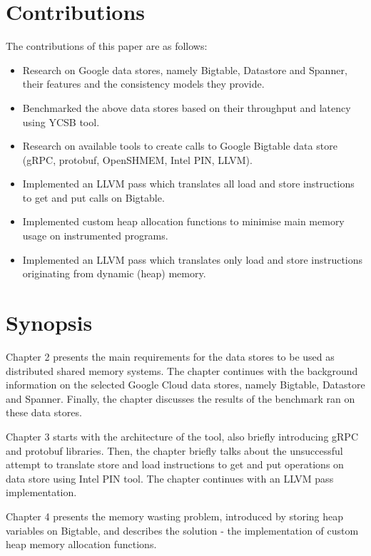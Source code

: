 \documentclass[bsc,frontabs,twoside,singlespacing,parskip,deptreport]{infthesis}     %
\begin{document}
\section{Contributions}

The contributions of this paper are as follows:
\begin{itemize}
\item
Research on Google data stores, namely Bigtable, Datastore and Spanner, their features and the consistency models they provide.
\item
Benchmarked the above data stores based on their throughput and latency using YCSB tool.
\item
Research on available tools to create calls to Google Bigtable data store (gRPC, protobuf, OpenSHMEM, Intel PIN, LLVM).
\item
Implemented an LLVM pass which translates all load and store instructions to get and put calls on Bigtable.
\item
Implemented custom heap allocation functions to minimise main memory usage on instrumented programs.
\item
Implemented an LLVM pass which translates only load and store instructions originating from dynamic (heap) memory.
\end{itemize}


\section{Synopsis}

Chapter 2 presents the main requirements for the data stores to be used as distributed shared memory systems. The chapter continues with the background information on the selected Google Cloud data stores, namely Bigtable, Datastore and Spanner. Finally, the chapter discusses the results of the benchmark ran on these data stores.

Chapter 3 starts with the architecture of the tool, also briefly introducing gRPC and protobuf libraries. Then, the chapter briefly talks about the unsuccessful attempt to translate store and load instructions to get and put operations on data store using Intel PIN tool. The chapter continues with an LLVM pass implementation.

Chapter 4 presents the memory wasting problem, introduced by storing heap variables on Bigtable, and describes the solution - the implementation of custom heap memory allocation functions. 
\end{document}
